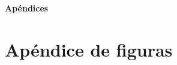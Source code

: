 \documentclass[12pt,twoside,titlepage]{report}
\begin{document}
\appendix

{}

\mbox{}
\vfill
\begin{center}
\begin{Huge}
\textbf{Apéndices}
\end{Huge}
\end{center}
\vfill
\mbox{}
\thispagestyle{empty}

\newpage
\mbox{}
\thispagestyle{empty}
\newpage


\chapter{Apéndice de figuras}
\label{sec:apendice}



\end{document}
